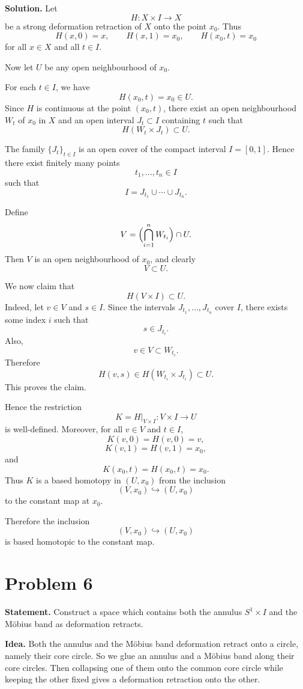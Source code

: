 \documentclass[12pt,a4paper]{article}
\theoremstyle{notespace}
\begin{document}
\medskip

\textbf{Solution.}
Let
\[
H:X\times I\to X
\]
be a strong deformation retraction of \(X\) onto the point \(x_0\). Thus
\[
H(x,0)=x,
\qquad
H(x,1)=x_0,
\qquad
H(x_0,t)=x_0
\]
for all \(x\in X\) and all \(t\in I\).

Now let \(U\) be any open neighbourhood of \(x_0\).

For each \(t\in I\), we have
\[
H(x_0,t)=x_0\in U.
\]
Since \(H\) is continuous at the point \((x_0,t)\), there exist an open neighbourhood \(W_t\) of \(x_0\) in \(X\) and an open interval \(J_t\subset I\) containing \(t\) such that
\[
H(W_t\times J_t)\subset U.
\]

The family \(\{J_t\}_{t\in I}\) is an open cover of the compact interval \(I=[0,1]\). Hence there exist finitely many points
\[
t_1,\dots,t_n\in I
\]
such that
\[
I=J_{t_1}\cup\cdots\cup J_{t_n}.
\]

Define
\[
V=\Bigl(\bigcap_{i=1}^n W_{t_i}\Bigr)\cap U.
\]
Then \(V\) is an open neighbourhood of \(x_0\), and clearly
\[
V\subset U.
\]

We now claim that
\[
H(V\times I)\subset U.
\]
Indeed, let \(v\in V\) and \(s\in I\). Since the intervals \(J_{t_1},\dots,J_{t_n}\) cover \(I\), there exists some index \(i\) such that
\[
s\in J_{t_i}.
\]
Also,
\[
v\in V\subset W_{t_i}.
\]
Therefore
\[
H(v,s)\in H(W_{t_i}\times J_{t_i})\subset U.
\]
This proves the claim.

Hence the restriction
\[
K=H|_{V\times I}:V\times I\to U
\]
is well-defined. Moreover, for all \(v\in V\) and \(t\in I\),
\[
K(v,0)=H(v,0)=v,
\]
\[
K(v,1)=H(v,1)=x_0,
\]
and
\[
K(x_0,t)=H(x_0,t)=x_0.
\]
Thus \(K\) is a based homotopy in \((U,x_0)\) from the inclusion
\[
(V,x_0)\hookrightarrow (U,x_0)
\]
to the constant map at \(x_0\).

Therefore the inclusion
\[
(V,x_0)\hookrightarrow (U,x_0)
\]
is based homotopic to the constant map.

\section{Problem 6}

\textbf{Statement.}
Construct a space which contains both the annulus \(S^1\times I\) and the Möbius band as deformation retracts.

\medskip

\textbf{Idea.}
Both the annulus and the Möbius band deformation retract onto a circle, namely their core circle. So we glue an annulus and a Möbius band along their core circles. Then collapsing one of them onto the common core circle while keeping the other fixed gives a deformation retraction onto the other.
\end{document}
